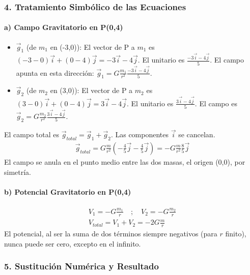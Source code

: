 \subsubsection*{4. Tratamiento Simbólico de las Ecuaciones}
\paragraph*{a) Campo Gravitatorio en P(0,4)}
\begin{itemize}
    \item $\vec{g}_1$ (de $m_1$ en (-3,0)): El vector de P a $m_1$ es $(-3-0)\vec{i}+(0-4)\vec{j} = -3\vec{i}-4\vec{j}$. El unitario es $\frac{-3\vec{i}-4\vec{j}}{5}$. El campo apunta en esta dirección: $\vec{g}_1 = G\frac{m_1}{r^2}\frac{-3\vec{i}-4\vec{j}}{5}$.
    \item $\vec{g}_2$ (de $m_2$ en (3,0)): El vector de P a $m_2$ es $(3-0)\vec{i}+(0-4)\vec{j} = 3\vec{i}-4\vec{j}$. El unitario es $\frac{3\vec{i}-4\vec{j}}{5}$. El campo es $\vec{g}_2 = G\frac{m_2}{r^2}\frac{3\vec{i}-4\vec{j}}{5}$.
\end{itemize}
El campo total es $\vec{g}_{total} = \vec{g}_1 + \vec{g}_2$. Las componentes $\vec{i}$ se cancelan.
\begin{gather}
    \vec{g}_{total} = G\frac{m}{r^2}\left(-\frac{4}{5}\vec{j} - \frac{4}{5}\vec{j}\right) = -G\frac{m}{r^2}\frac{8}{5}\vec{j}
\end{gather}
El campo se anula en el punto medio entre las dos masas, el origen (0,0), por simetría.

\paragraph*{b) Potencial Gravitatorio en P(0,4)}
\begin{gather}
    V_1 = -G\frac{m_1}{r} \quad ; \quad V_2 = -G\frac{m_2}{r} \\
    V_{total} = V_1 + V_2 = -2G\frac{m}{r}
\end{gather}
El potencial, al ser la suma de dos términos siempre negativos (para $r$ finito), nunca puede ser cero, excepto en el infinito.

\subsubsection*{5. Sustitución Numérica y Resultado}
